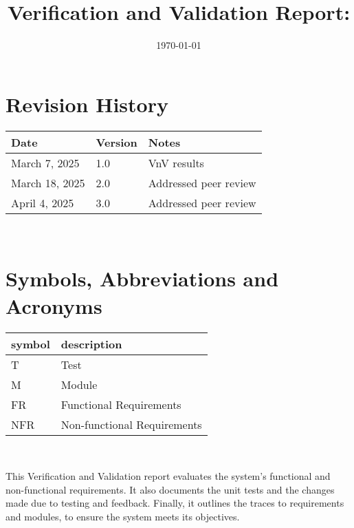 \documentclass[12pt, titlepage]{article}
\begin{document}
\title{Verification and Validation Report: \progname} 
\author{\authname}
\date{\today}
	
\maketitle


\section{Revision History}

\begin{tabularx}{\textwidth}{p{3cm}p{2cm}X}
\toprule {\bf Date} & {\bf Version} & {\bf Notes}\\
\midrule
March 7, 2025 & 1.0 & VnV results\\
\midrule
March 18, 2025 & 2.0 & Addressed peer review\\
\midrule
April 4, 2025 & 3.0 & Addressed peer review\\
\bottomrule
\end{tabularx}

~\newpage

\section{Symbols, Abbreviations and Acronyms}

\renewcommand{\arraystretch}{1.2}
\begin{tabular}{l l} 
  \toprule		
  \textbf{symbol} & \textbf{description}\\
  \midrule 
  T & Test\\
  M & Module\\
  FR & Functional Requirements\\
  NFR & Non-functional Requirements\\
  \bottomrule
\end{tabular}\\

\newpage

\tableofcontents

\listoftables %

\listoffigures %

\newpage


This Verification and Validation report evaluates the system's functional and non-functional requirements. It also documents the unit tests and the changes made due to testing and feedback. Finally, it outlines the traces to requirements and modules, to ensure the system meets its objectives.
\end{document}
